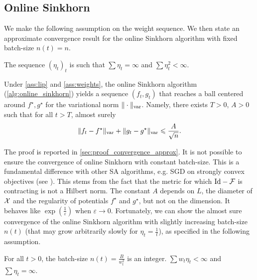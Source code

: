 \subsection{Online Sinkhorn}

We make the following \citet{robbins1951stochastic} assumption on the weight sequence. We then state an approximate convergence result for the online Sinkhorn algorithm with fixed batch-size $n(t) = n$.

\begin{assumption}\label{ass:weights}
    The sequence ${(\eta_t)}_t$ is such that
    $\sum \eta_t = \infty$ and $\sum \eta_t^2 < \infty$.
\end{assumption}

\begin{proposition}\label{prop:convergence_approx}
    Under \autoref{ass:lip} and \ref{ass:weights}, the online Sinkhorn algorithm (\autoref{alg:online_sinkhorn}) yields a sequence $(f_t, g_t)$ that reaches a
    ball centered around $f^\star, g^\star$ for the variational norm $\Vert
    \cdot \Vert_{\text{\upshape var}}$.
     Namely, there exists $T > 0$, $A > 0$ such that for all $t > T$, almost surely
    \begin{equation}
        \Vert f_t - f^\star \Vert_{\text{\upshape var}}
        + \Vert g_t - g^\star \Vert_{\text{\upshape var}} 
        \leqslant \frac{A}{\sqrt{n}} .
    \end{equation}
\end{proposition}

The proof is reported in \autoref{sec:proof_convergence_approx}. It is not possible
to ensure the convergence of online Sinkhorn with constant batch-size. This is a
fundamental difference with other SA algorithms, e.g. SGD on strongly convex
objectives (see \cite{moulines_non-asymptotic_2011}). This stems from the fact
that the metric for which $\text{Id} - \mathcal{F}$ is contracting is
not a Hilbert norm. The constant $A$ depends on $L$, the diameter of $\mathcal{X}$ and the regularity of potentials $f^\star$ and $g^\star$, but not on the dimension. It behaves like $\exp(\frac{1}{\varepsilon})$ when
$\varepsilon \to 0$.
Fortunately, we can show the almost sure convergence of the online Sinkhorn algorithm
with slightly increasing batch-size $n(t)$ (that may grow arbitrarily slowly for $\eta_t = \frac{1}{t}$), as specified in the following
assumption.

\begin{assumption}\label{ass:double_weights}
    For all $t > 0$, the batch-size $n(t) = \frac{B}{w_t^2}$ is an integer. $\sum w_t \eta_t <
    \infty$ and $\sum \eta_t = \infty$.
\end{assumption}


